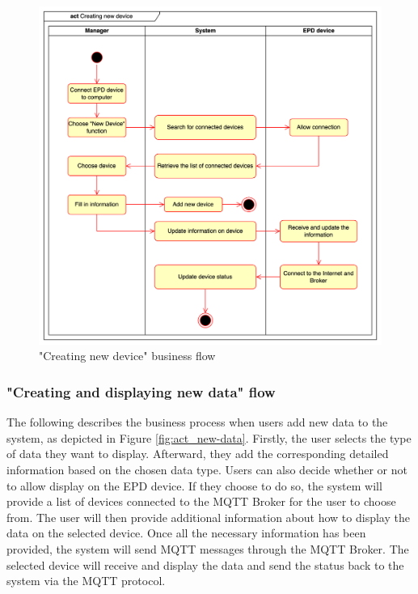 \documentclass[../Main.tex]{subfiles}
\begin{document}
\begin{figure}[H]
    \centering
    \includegraphics[scale=0.155]{doc/imgs/act_new-device.png}
    \caption{"Creating new device" business flow}
    \label{fig:act_new-device}
\end{figure}

\subsubsection{"Creating and displaying new data" flow}
The following describes the business process when users add new data to the system, as depicted in Figure \ref{fig:act_new-data}. Firstly, the user selects the type of data they want to display. Afterward, they add the corresponding detailed information based on the chosen data type. Users can also decide whether or not to allow display on the EPD device. If they choose to do so, the system will provide a list of devices connected to the MQTT Broker for the user to choose from. The user will then provide additional information about how to display the data on the selected device. Once all the necessary information has been provided, the system will send MQTT messages through the MQTT Broker. The selected device will receive and display the data and send the status back to the system via the MQTT protocol.
\end{document}
